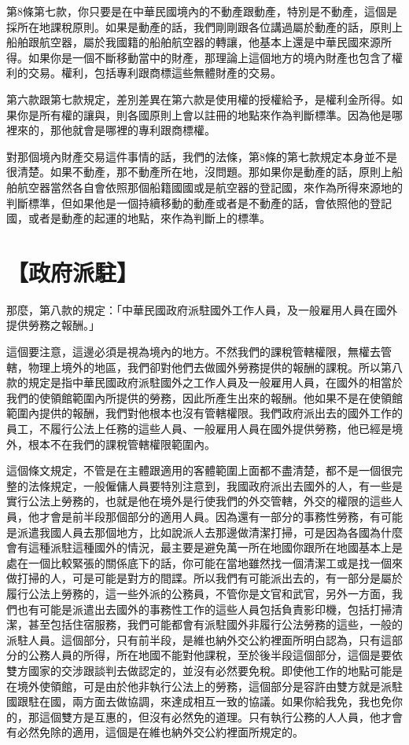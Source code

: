 \documentclass[]{ctexbook}
\begin{document}
第8條第七款，你只要是在中華民國境內的不動產跟動產，特別是不動產，這個是採所在地課稅原則。如果是動產的話，我們剛剛跟各位講過屬於動產的話，原則上船舶跟航空器，屬於我國籍的船舶航空器的轉讓，他基本上還是中華民國來源所得。如果你是一個不斷移動當中的財產，那理論上這個地方的境內財產也包含了權利的交易。權利，包括專利跟商標這些無體財產的交易。

第六款跟第七款規定，差別差異在第六款是使用權的授權給予，是權利金所得。如果你是所有權的讓與，則各國原則上會以註冊的地點來作為判斷標準。因為他是哪裡來的，那他就會是哪裡的專利跟商標權。

對那個境內財產交易這件事情的話，我們的法條，第8條的第七款規定本身並不是很清楚。如果不動產，那不動產所在地，沒問題。那如果你是動產的話，原則上船舶航空器當然各自會依照那個船籍國國或是航空器的登記國，來作為所得來源地的判斷標準，但如果他是一個持續移動的動產或者是不動產的話，會依照他的登記國，或者是動產的起運的地點，來作為判斷上的標準。

\hypertarget{ux653fux5e9cux6d3eux99d0}{%
\section{【政府派駐】}\label{ux653fux5e9cux6d3eux99d0}}

那麼，第八款的規定：「中華民國政府派駐國外工作人員，及一般雇用人員在國外提供勞務之報酬。」

這個要注意，這邊必須是視為境內的地方。不然我們的課稅管轄權限，無權去管轄，物理上境外的地區，我們卻對他們去做國外勞務提供的報酬的課稅。所以第八款的規定是指中華民國政府派駐國外之工作人員及一般雇用人員，在國外的相當於我們的使領館範圍內所提供的勞務，因此所產生出來的報酬。他如果不是在使領館範圍內提供的報酬，我們對他根本也沒有管轄權限。我們政府派出去的國外工作的員工，不履行公法上任務的這些人員、一般雇用人員在國外提供勞務，他已經是境外，根本不在我們的課稅管轄權限範圍內。

這個條文規定，不管是在主體跟適用的客體範圍上面都不盡清楚，都不是一個很完整的法條規定，一般僱傭人員要特別注意到，我國政府派出去國外的人，有一些是實行公法上勞務的，也就是他在境外是行使我們的外交管轄，外交的權限的這些人員，他才會是前半段那個部分的適用人員。因為還有一部分的事務性勞務，有可能是派遣我國人員去那個地方，比如說派人去那邊做清潔打掃，可是因為各國為什麼會有這種派駐這種國外的情況，最主要是避免萬一所在地國你跟所在地國基本上是處在一個比較緊張的關係底下的話，你可能在當地雖然找一個清潔工或是找一個來做打掃的人，可是可能是對方的間諜。所以我們有可能派出去的，有一部分是屬於履行公法上勞務的，這一些外派的公務員，不管你是文官和武官，另外一方面，我們也有可能是派遣出去國外的事務性工作的這些人員包括負責影印機，包括打掃清潔，甚至包括住宿服務，我們可能都會有派駐國外非履行公法勞務的這些，一般的派駐人員。這個部分，只有前半段，是維也納外交公約裡面所明白認為，只有這部分的公務人員的所得，所在地國不能對他課稅，至於後半段這個部分，這個是要依雙方國家的交涉跟談判去做認定的，並沒有必然要免稅。即使他工作的地點可能是在境外使領館，可是由於他非執行公法上的勞務，這個部分是容許由雙方就是派駐國跟駐在國，兩方面去做協調，來達成相互一致的協議。如果你給我免，我也免你的，那這個雙方是互惠的，但沒有必然免的道理。只有執行公務的人人員，他才會有必然免除的適用，這個是在維也納外交公約裡面所規定的。
\end{document}
